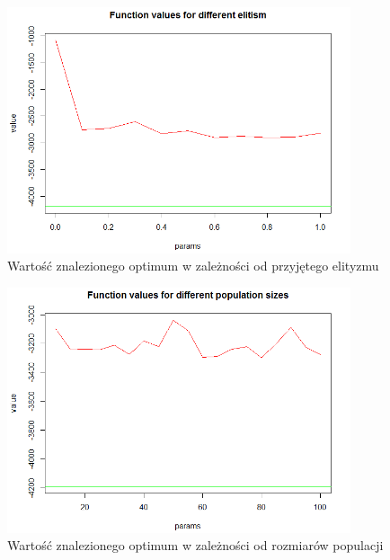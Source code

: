 \documentclass[11pt, a4paper]{article}
\begin{document}
\begin{figure}[H]
	\begin{center}
		\includegraphics[width=0.9\textwidth]{./assets/Schwefel4.png} %
		\caption{Wartość znalezionego optimum w zależności od przyjętego elityzmu}
		\label{fig:schwefel4}
	\end{center}
\end{figure}

\begin{figure}[H]
	\begin{center}
		\includegraphics[width=0.9\textwidth]{./assets/Schwefel5.png} %
		\caption{Wartość znalezionego optimum w zależności od rozmiarów populacji}
		\label{fig:schwefel5}
	\end{center}
\end{figure}
\end{document}
